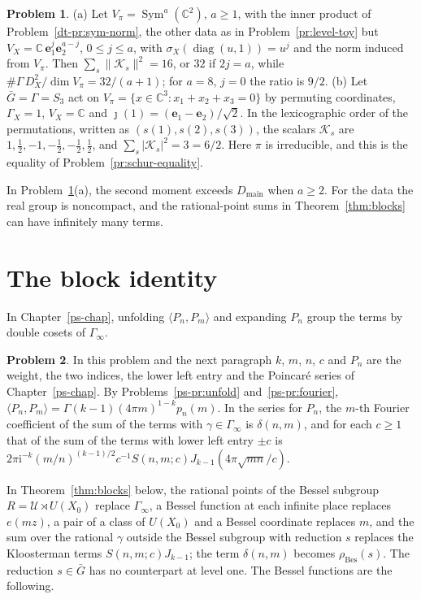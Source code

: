 \documentclass[reqno]{amsart}
\newcounter{chap}
\theoremstyle{definition}
\newtheorem{problem}{Problem}[section]
\theoremstyle{plain}
\theoremstyle{remark}
\newcommand{\C}{\mathbb{C}}
\newcommand{\ii}{\mathrm{i}}
\newcommand{\Gb}{\bar G}
\newcommand{\Kc}{\mathcal K}
\newcommand{\Uc}{\mathcal U}
\newcommand{\rB}{\rho_{\mathrm{Bes}}}
\newcommand{\Dmain}{D_{\mathrm{main}}}
\newcommand{\Sym}{\operatorname{Sym}}
\newcommand{\diag}{\operatorname{diag}}
\begin{document}
\begin{problem}\label{pr:sym}
(a) Let \(V_\pi=\Sym^a(\C^2)\), \(a\ge1\), with the inner product of Problem~\ref{dt-pr:sym-norm}, the other data as in Problem~\ref{pr:level-toy} but \(V_X=\C\,\mathbf e_1^j\mathbf e_2^{a-j}\), \(0\le j\le a\), with \(\sigma_X(\diag(u,1))=u^j\) and the norm induced from \(V_\pi\).  Then \(\sum_s\lVert\Kc_s\rVert^2=16\), or \(32\) if \(2j=a\), while \(\#\Gamma\,D_X^2/\dim V_\pi=32/(a+1)\); for \(a=8\), \(j=0\) the ratio is \(9/2\).
(b) Let \(\Gb=\Gamma=S_3\) act on \(V_\pi=\{x\in\C^3:x_1+x_2+x_3=0\}\) by permuting coordinates, \(\Gamma_X=1\), \(V_X=\C\) and \(\jmath(1)=(\mathbf e_1-\mathbf e_2)/\sqrt2\).  In the lexicographic order of the permutations, written as \((s(1),s(2),s(3))\), the scalars \(\Kc_s\) are \(1,\frac12,-1,-\frac12,-\frac12,\frac12\), and \(\sum_s\lvert\Kc_s\rvert^2=3=6/2\).  Here \(\pi\) is irreducible, and this is the equality of Problem~\ref{pr:schur-equality}.
\end{problem}

In Problem~\ref{pr:sym}(a), the second moment exceeds \(\Dmain\) when \(a\ge2\).  For the data the real group is noncompact, and the rational-point sums in Theorem~\ref{thm:blocks} can have infinitely many terms.

\section{The block identity}\label{sec:blocks}

In Chapter~\ref{ps-chap}, unfolding \(\langle P_n,P_m\rangle\) and expanding \(P_n\) group the terms by double cosets of \(\Gamma_\infty\).

\begin{problem}\label{pr:petersson-terms}
In this problem and the next paragraph \(k\), \(m\), \(n\), \(c\) and \(P_n\) are the weight, the two indices, the lower left entry and the Poincar\'e series of Chapter~\ref{ps-chap}.  By Problems~\ref{ps-pr:unfold} and~\ref{ps-pr:fourier}, \(\langle P_n,P_m\rangle=\Gamma(k-1)(4\pi m)^{1-k}p_n(m)\).  In the series for \(P_n\), the \(m\)-th Fourier coefficient of the sum of the terms with \(\gamma\in\Gamma_\infty\) is \(\delta(n,m)\), and for each \(c\ge1\) that of the sum of the terms with lower left entry \(\pm c\) is \(2\pi\ii^{-k}(m/n)^{(k-1)/2}c^{-1}S(n,m;c)J_{k-1}(4\pi\sqrt{mn}/c)\).
\end{problem}

In Theorem~\ref{thm:blocks} below, the rational points of the Bessel subgroup \(R=\Uc\rtimes U(X_0)\) replace \(\Gamma_\infty\), a Bessel function at each infinite place replaces \(e(mz)\), a pair of a class of \(U(X_0)\) and a Bessel coordinate replaces \(m\), and the sum over the rational \(\gamma\) outside the Bessel subgroup with reduction \(s\) replaces the Kloosterman terms \(S(n,m;c)J_{k-1}\); the term \(\delta(n,m)\) becomes \(\rB(s)\).  The reduction \(s\in\Gb\) has no counterpart at level one.  The Bessel functions are the following.
\end{document}

